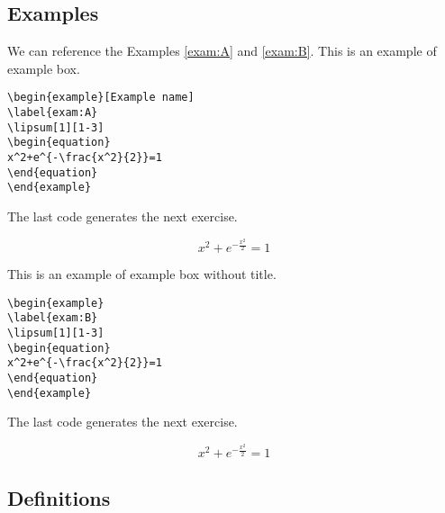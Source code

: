 \subsection{Examples}

We can reference the Examples \ref{exam:A} and \ref{exam:B}.
This is an example of example box.

\begin{highlightbox}
\begin{verbatim}
\begin{example}[Example name]
\label{exam:A}
\lipsum[1][1-3]
\begin{equation}
x^2+e^{-\frac{x^2}{2}}=1
\end{equation}
\end{example}
\end{verbatim}
\end{highlightbox}

The last code generates the next exercise.
\begin{example}
\label{exam:A}
\lipsum[1][1-3]
\begin{equation}
x^2+e^{-\frac{x^2}{2}}=1
\end{equation}
\end{example}

This is an example of example box without title.
\begin{highlightbox}
\begin{verbatim}
\begin{example}
\label{exam:B}
\lipsum[1][1-3]
\begin{equation}
x^2+e^{-\frac{x^2}{2}}=1
\end{equation}
\end{example}
\end{verbatim}
\end{highlightbox}

The last code generates the next exercise.
\begin{example}
\label{exam:B}
\lipsum[1][1-3]
\begin{equation}
x^2+e^{-\frac{x^2}{2}}=1
\end{equation}
\end{example}
\subsection{Definitions}

